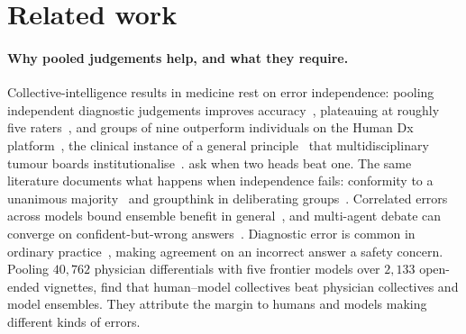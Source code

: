 \section{Related work}
\label{sec:related}

\paragraph{Why pooled judgements help, and what they require.}
Collective-intelligence results in medicine rest on error independence: pooling independent
diagnostic judgements improves accuracy~\citep{kurvers2016boosting, wolf2015collective},
plateauing at roughly five raters~\citep{kammer2017}, and groups of nine outperform individuals on
the Human Dx platform~\citep{barnett2019}, the clinical instance of a general
principle~\citep{surowiecki2004wisdom} that multidisciplinary tumour boards
institutionalise~\citep{radcliffe2019tumorboard}. \citet{hautz2024} ask when two heads beat one.
The same literature documents what happens when independence
fails: conformity to a unanimous majority~\citep{asch1956conformity} and groupthink in
deliberating groups~\citep{janis1972groupthink}. Correlated errors across models bound ensemble
benefit in general~\citep{correlated2025}, and multi-agent debate can converge on
confident-but-wrong answers~\citep{demystifying_mad}. Diagnostic error is common in ordinary
practice~\citep{graber2013diagnosticerror, singh2014frequency}, making agreement on an incorrect
answer a safety concern. Pooling $40{,}762$ physician differentials with five frontier models over
$2{,}133$ open-ended vignettes, \citet{zoller2025hybrid} find that human--model collectives beat
physician collectives and model ensembles. They attribute the margin to humans and models making
different kinds of errors.

